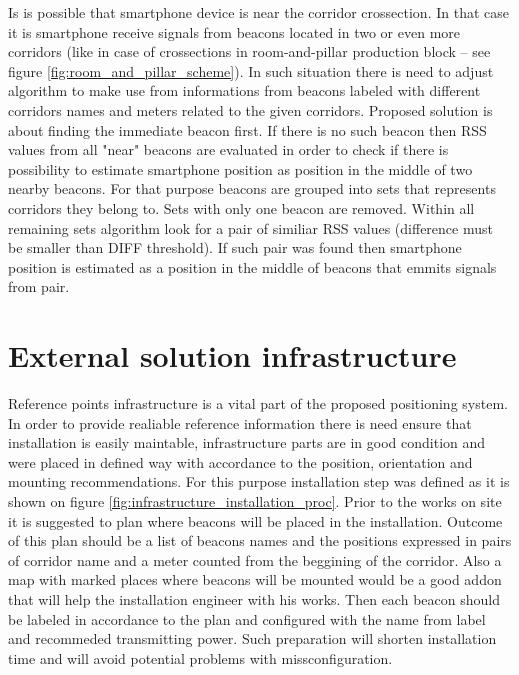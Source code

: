 \documentclass[../main.tex]{subfiles}
\begin{document}
Is is possible that smartphone device is near the corridor crossection. In that case it is smartphone receive signals from beacons located in two or even more corridors (like in case of crossections in room-and-pillar production block -- see figure \ref{fig:room_and_pillar_scheme}). In such situation there is need to adjust algorithm to make use from informations from beacons labeled with different corridors names and meters related to the given corridors. Proposed solution is about finding the immediate beacon first. If there is no such beacon then RSS values from all "near" beacons are evaluated in order to check if there is possibility to estimate smartphone position as position in the middle of two nearby beacons. For that purpose beacons are grouped into sets that represents corridors they belong to. Sets with only one beacon are removed. Within all remaining sets algorithm look for a pair of similiar RSS values (difference must be smaller than DIFF threshold). If such pair was found then smartphone position is estimated as a position in the middle of beacons that emmits signals from pair.


\section{External solution infrastructure} %
\label{sec:external_solution_infrastructure}

Reference points infrastructure is a vital part of the proposed positioning system. In order to provide realiable reference information there is need ensure that installation is easily maintable, infrastructure parts are in good condition and were placed in defined way with accordance to the position, orientation and mounting recommendations. For this purpose installation step was defined as it is shown on figure \ref{fig:infrastructure_installation_proc}. Prior to the works on site it is suggested to plan where beacons will be placed in the installation. Outcome of this plan should be a list of beacons names and the positions expressed in pairs of corridor name and a meter counted from the beggining of the corridor. Also a map with marked places where beacons will be mounted would be a good addon that will help the installation engineer with his works. Then each beacon should be labeled in accordance to the plan and configured with the name from label and recommeded transmitting power. Such preparation will shorten installation time and will avoid potential problems with missconfiguration.
\end{document}
